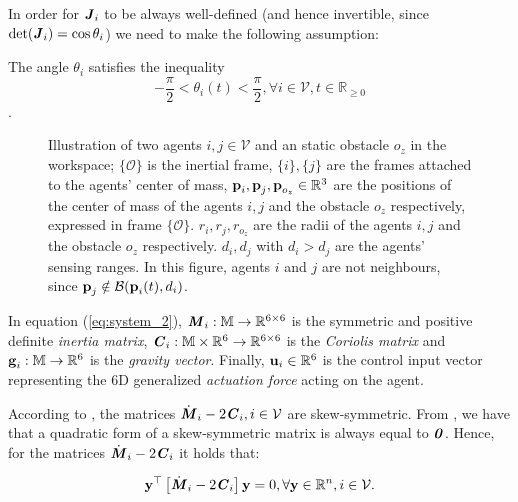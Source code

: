 In order for $\bm{\mathit{J}}_i$ to be always well-defined (and hence invertible, since
$\det(\bm{\mathit{J}}_i) = \cos\theta_i$) we need to make the following assumption:

\begin{gray_box}
\begin{assumption}
	The angle $\theta_i$ satisfies the inequality
  $$-\frac{\pi}{2} < \theta_i(t) < \frac{\pi}{2} ,\forall i\in\mathcal{V},t\in\mathbb{R}_{\geq 0}$$.
\label{as:J}
\end{assumption}
\end{gray_box}

\begin{figure}[ht!]
	\centering
    
    \caption{Illustration of two agents $i, j \in \mathcal{V}$ and an static
      obstacle $o_z$ in the workspace; $\{\mathcal{O}\}$ is the inertial frame,
      $\{i\}, \{j\}$ are the frames attached to the agents' center of mass,
      $\bm{\mathbf{p}}_i, \bm{\mathbf{p}}_j, \bm{\mathbf{p}}_{o_z} \in \mathbb{R}^3$ are the
      positions of the center of mass of the agents $i,j$ and the
      obstacle $o_z$ respectively, expressed in frame
      $\{\mathcal{O}\}$. $r_i, r_j, r_{o_z}$ are the radii of the agents $i,j$
      and the obstacle $o_z$ respectively. $d_i, d_j$ with
      $d_i > d_j$ are the agents' sensing ranges.
      In this figure, agents $i$ and $j$ are not neighbours, since
      $\bm{\mathbf{p}}_j \notin \mathcal{B}(\bm{\mathbf{p}}_i(t), d_i)$.}
	\label{fig:two_agents_one_obstacle}
\end{figure}

In equation (\ref{eq:system_2}), $\bm{\mathit{M}}_i:\mathbb{M} \to \mathbb{R}^{6\times6}$ is
the symmetric and positive definite \textit{inertia matrix},
$\bm{\mathit{C}}_i:\mathbb{M}\times\mathbb{R}^6 \to \mathbb{R}^{6\times6}$ is the
\textit{Coriolis matrix} and $\bm{\mathbf{g}}_i:\mathbb{M} \to \mathbb{R}^6$ is the
\textit{gravity vector}.
Finally, $\bm{\mathbf{u}}_i\in\mathbb{R}^6$ is the control input vector representing
the $6$D generalized \textit{actuation force} acting on the agent.



\begin{full_box}
  \begin{remark}
    According to \cite{Siciliano2009}, the matrices
    $\dot{\bm{\mathit{M}}}_i - 2\bm{\mathit{C}}_i, i \in \mathcal{V}$ are skew-symmetric.
    From \cite{horn_jonshon}, we have that a quadratic form of a skew-symmetric
    matrix is always equal to $\bm{\mathit{0}}$. Hence, for the matrices
    $\dot{\bm{\mathit{M}}}_i - 2 \bm{\mathit{C}}_i$ it holds that:

    \begin{equation} \label{eq:skew_symm}
      \bm{\mathbf{y}}^\top \left[\dot{\bm{\mathit{M}}}_i - 2 \bm{\mathit{C}}_i\right]\bm{\mathbf{y}} = 0,
        \forall \bm{\mathbf{y}} \in \mathbb{R}^n, i \in \mathcal{V}.
    \end{equation}
  \end{remark}
\end{full_box}

